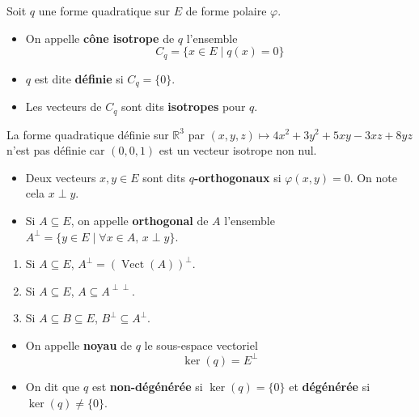   Soit $q$ une forme quadratique sur $E$ de forme polaire $\varphi$.

  \begin{definition}
    \begin{itemize}
      \item On appelle \textbf{cône isotrope} de $q$ l'ensemble
      \[ C_q = \{ x \in E \mid q(x) = 0 \} \]
      \item $q$ est dite \textbf{définie} si $C_q = \{ 0 \}$.
      \item Les vecteurs de $C_q$ sont dits \textbf{isotropes} pour $q$.
    \end{itemize}
  \end{definition}


  \begin{example}
    La forme quadratique définie sur $\mathbb{R}^3$ par $(x, y, z) \mapsto 4x^2 + 3y^2 + 5xy - 3xz + 8yz$ n'est pas définie car $(0,0,1)$ est un vecteur isotrope non nul.
  \end{example}


  \begin{definition}
    \begin{itemize}
      \item Deux vecteurs $x, y \in E$ sont dits \textbf{$q$-orthogonaux} si $\varphi(x, y) = 0$. On note cela $x \perp y$.
      \item Si $A \subseteq E$, on appelle \textbf{orthogonal} de $A$ l'ensemble $A^\perp = \{ y \in E \mid \forall x \in A, \, x \perp y \}$.
    \end{itemize}
  \end{definition}

  \begin{proposition}
    \begin{enumerate}[label={\bfseries(\roman*)}]
      \item Si $A \subseteq E$, $A^\perp = (\operatorname{Vect}(A))^\perp$.
      \item Si $A \subseteq E$, $A \subseteq A^{\perp\perp}$.
      \item Si $A \subseteq B \subseteq E$, $B^{\perp} \subseteq A^{\perp}$.
    \end{enumerate}
  \end{proposition}

  \begin{definition}
    \begin{itemize}
      \item On appelle \textbf{noyau} de $q$ le sous-espace vectoriel
      \[ \ker(q) = E^{\perp} \]
      \item On dit que $q$ est \textbf{non-dégénérée} si $\ker(q) = \{ 0 \}$ et \textbf{dégénérée} si $\ker(q) \neq \{ 0 \}$.
    \end{itemize}
  \end{definition}

